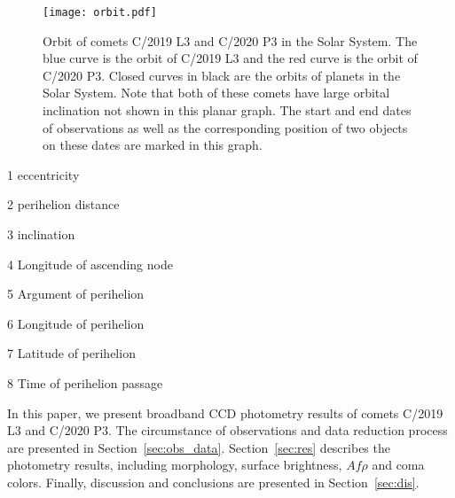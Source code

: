 \begin{figure}
    \centering
    \texttt{[image: orbit.pdf]}
    \caption{Orbit of comets C/2019 L3 and C/2020 P3 in the Solar System. The blue curve is the orbit of C/2019 L3 and the red curve is the orbit of C/2020 P3. Closed curves in black are the orbits of planets in the Solar System. Note that both of these comets have large orbital inclination not shown in this planar graph. The start and end dates of observations as well as the corresponding position of two objects on these dates are marked in this graph. }
    \label{fig:orbit}
\end{figure}

\begin{table}
    \centering
    \caption{Orbital elements of comets C/2019 L3 and C/2020 P3 (Epoch: ). }\label{tab:orb_elem}
    \begin{threeparttable}
        \begin{tablenotes}
            \item[1] eccentricity 
            \item[2] perihelion distance
            \item[3] inclination
            \item[4] Longitude of ascending node
            \item[5] Argument of perihelion
            \item[6] Longitude of perihelion
            \item[7] Latitude of perihelion
            \item[8] Time of perihelion passage
        \end{tablenotes}
    \end{threeparttable}
\end{table}

In this paper, we present broadband CCD photometry results of comets C/2019 L3 and C/2020 P3. The circumstance of observations and data reduction process are presented in Section~\ref{sec:obs_data}. Section~\ref{sec:res} describes the photometry results, including morphology, surface brightness, $Af\rho$ and coma colors. Finally, discussion and conclusions are presented in Section~\ref{sec:dis}. 
